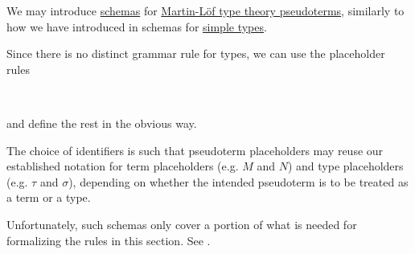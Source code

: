 \begin{remark}\label{rem:pseudoterm_schemas}
  We may introduce \hyperref[con:schemas_and_instances]{schemas} for \hyperref[def:mltt_pseudoterm]{Martin-L\"of type theory pseudoterms}, similarly to how we have introduced in  schemas for \hyperref[def:simple_type]{simple types}.

  Since there is no distinct grammar rule for types, we can use the placeholder rules
  \begin{bnf*}
       {} \\
     { \bnfor {}}
  \end{bnf*}
  and define the rest in the obvious way.

  The choice of identifiers is such that pseudoterm placeholders may reuse our established notation for term placeholders (e.g. \( M \) and \( N \)) and type placeholders (e.g. \( \tau \) and \( \sigma \)), depending on whether the intended pseudoterm is to be treated as a term or a type.

  Unfortunately, such schemas only cover a portion of what is needed for formalizing the rules in this section. See .
\end{remark}

